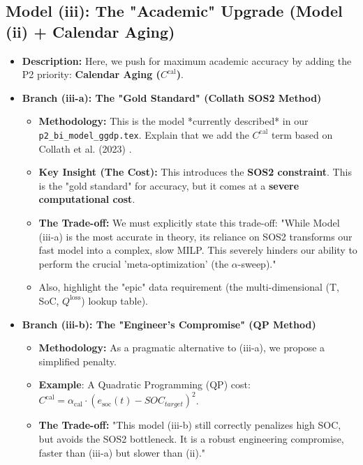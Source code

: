 \documentclass[11pt, a4paper]{article}
\begin{document}
\subsection{Model (iii): The "Academic" Upgrade (Model (ii) + Calendar Aging)}
\begin{itemize}
    \item \textbf{Description:} Here, we push for maximum academic accuracy by adding the P2 priority: \textbf{Calendar Aging ($C^{\mathrm{cal}}$)}.
    
    \item \textbf{Branch (iii-a): The "Gold Standard" (Collath SOS2 Method)}
    \begin{itemize}
        \item \textbf{Methodology:} This is the model *currently described* in our \texttt{p2\_bi\_model\_ggdp.tex}. Explain that we add the $C^{\mathrm{cal}}$ term based on Collath et al. (2023) \cite{collath2023}.
        \item \textbf{Key Insight (The Cost):} This introduces the \textbf{SOS2 constraint}. This is the "gold standard" for accuracy, but it comes at a \textbf{severe computational cost}.
        \item \textbf{The Trade-off:} We must explicitly state this trade-off: "While Model (iii-a) is the most accurate in theory, its reliance on SOS2 transforms our fast model into a complex, slow MILP. This severely hinders our ability to perform the crucial 'meta-optimization' (the $\alpha$-sweep)."
        \item Also, highlight the "epic" data requirement (the multi-dimensional (T, SoC, $Q^{\mathrm{loss}}$) lookup table).
    \end{itemize}
    
    \item \textbf{Branch (iii-b): The "Engineer's Compromise" (QP Method)}
    \begin{itemize}
        \item \textbf{Methodology:} As a pragmatic alternative to (iii-a), we propose a simplified penalty.
        \item \textbf{Example}: A Quadratic Programming (QP) cost: $C^{\mathrm{cal}} = \alpha_{\mathrm{cal}} \cdot (e_{\mathrm{soc}}(t) - SOC_{target})^2$.
        \item \textbf{The Trade-off:} "This model (iii-b) still correctly penalizes high SOC, but avoids the SOS2 bottleneck. It is a robust engineering compromise, faster than (iii-a) but slower than (ii)."
    \end{itemize}
\end{itemize}
\end{document}
